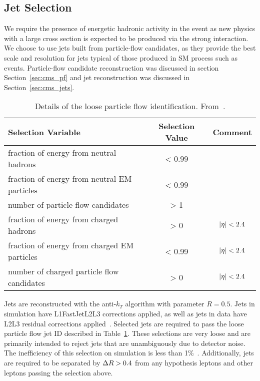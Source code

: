 \subsection{Jet Selection}
\label{sec:evtsel_jets}
We require the presence of energetic hadronic activity in the event as new
physics with a large cross section is expected to be produced via the strong
interaction. We choose to use jets built from particle-flow candidates, as
they provide the best scale and resolution for jets typical of those produced
in SM process such as \ttbar events. Particle-flow candidate reconstruction
was discussed in section Section~\ref{sec:cms_pf} and jet reconstruction was
discussed in Section~\ref{sec:cms_jets}.

\begin{table}[!hbt]
\begin{center}
\caption[Details of the loose particle flow identification]
{\label{tab:evtsel_jetid}
Details of the loose particle flow identification. From~\cite{an_003_2010}.
}
\begin{tabular}{l|c|c}
\hline\hline
Selection Variable                           & Selection Value & Comment       \\ \hline
fraction of energy from neutral hadrons      & < 0.99          &               \\ 
fraction of energy from neutral EM particles & < 0.99          &               \\ 
number of particle flow candidates           & > 1             &               \\ 
fraction of energy from charged hadrons      & > 0             & $\left|\eta\right| < 2.4$ \\ 
fraction of energy from charged EM particles & < 0.99          & $\left|\eta\right| < 2.4$ \\ 
number of charged particle flow candidates   & > 0             & $\left|\eta\right| < 2.4$ \\ 
\hline\hline
\end{tabular}
\end{center}
\end{table}
Jets are reconstructed with the anti-$k_T$ algorithm with parameter $R =
0.5$. Jets in simulation have L1FastJetL2L3 corrections applied, as well as
jets in data have L2L3 residual corrections applied~\cite{jetcorrtwiki}.
Selected jets are required to pass the loose particle flow jet ID described
in Table~\ref{tab:evtsel_jetid}. These selections are very loose and are
primarily intended to reject jets that are unambiguously due to detector
noise. The inefficiency of this selection on simulation is less than
1\%~\cite{an_003_2010}. Additionally, jets are required to be separated by $\Delta R
> 0.4$ from any hypothesis leptons and other leptons passing the selection
above.

